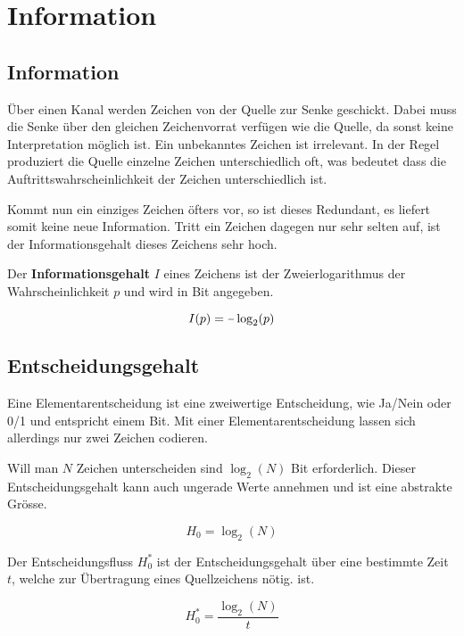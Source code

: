\section{Information}

\subsection{Information}
 
Über einen Kanal werden Zeichen von der Quelle zur Senke geschickt. Dabei muss
die Senke über den gleichen Zeichenvorrat verfügen wie die Quelle, da sonst
keine Interpretation möglich ist. Ein unbekanntes Zeichen ist irrelevant. In der
Regel produziert die Quelle einzelne Zeichen unterschiedlich oft, was bedeutet
dass die Auftrittswahrscheinlichkeit der Zeichen unterschiedlich ist. 

Kommt nun ein einziges Zeichen öfters vor, so ist dieses Redundant, es liefert
somit keine neue Information. Tritt ein Zeichen dagegen nur sehr selten auf, ist
der Informationsgehalt dieses Zeichens sehr hoch. 

Der \textbf{Informationsgehalt} $I$ eines Zeichens ist der Zweierlogarithmus der
Wahrscheinlichkeit $p$ und wird in Bit angegeben.

\begin{displaymath}
	I(p) = \unaryminus \log_2(p)
\end{displaymath}


\subsection{Entscheidungsgehalt}

Eine Elementarentscheidung ist eine zweiwertige Entscheidung, wie Ja/Nein oder
0/1 und entspricht einem Bit. Mit einer Elementarentscheidung lassen sich
allerdings nur zwei Zeichen codieren. 

Will man $N$ Zeichen unterscheiden sind $\log_2(N)$ Bit erforderlich. Dieser
Entscheidungsgehalt kann auch ungerade Werte annehmen und ist eine abstrakte
Grösse.

\begin{displaymath}
	H_0=\log_2(N)
\end{displaymath}

Der Entscheidungsfluss $H^*_0$ ist der Entscheidungsgehalt über eine bestimmte
Zeit $t$, welche zur Übertragung eines Quellzeichens nötig. ist.

\begin{displaymath}
	H^*_0=\frac{\log_2(N)}{t}
\end{displaymath}


